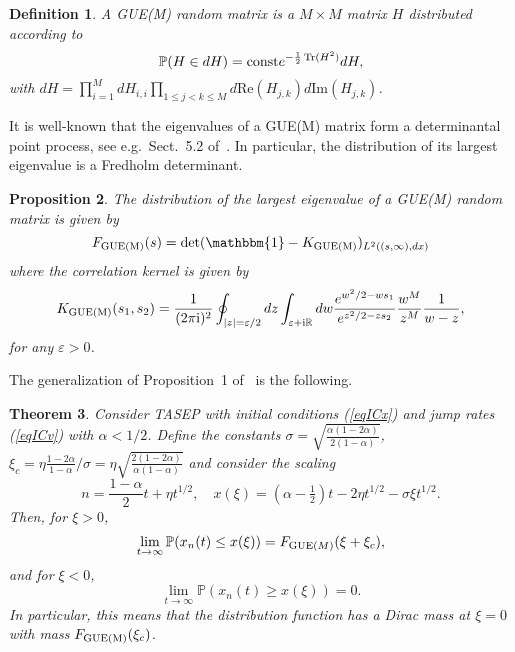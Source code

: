 \documentclass[12pt,a4paper]{article}
\numberwithin{equation}{section}
\newcommand{\Pb}{\mathbb{P}}
\newcommand{\Id}{\mathbbm{1}}
\newcommand{\e}{\varepsilon}
\newcommand{\I}{{\rm i}}
\newcommand{\R}{\mathbb{R}}
\renewcommand{\Re}{\mathrm{Re}}
\renewcommand{\Im}{\mathrm{Im}}
\DeclareMathOperator{\Tr}{Tr}
\newtheorem{prop}{Proposition}[section]
\newtheorem{thm}[prop]{Theorem}
\newtheorem{defin}[prop]{Definition}
\begin{document}
\begin{defin}
A GUE(M) random matrix is a $M\times M$ matrix $H$ distributed according to
\begin{equation}
\Pb(H\in dH)={\rm const} e^{-\frac12 \Tr(H^2)} dH,
\end{equation}
with $dH=\prod_{i=1}^M dH_{i,i}\prod_{1\leq j<k\leq M} d\Re(H_{j,k}) d\Im(H_{j,k})$.
\end{defin}
It is well-known that the eigenvalues of a GUE(M) matrix form a determinantal point process, see e.g.~Sect.~5.2 of~\cite{Meh91}. In particular, the distribution of its largest eigenvalue is a Fredholm determinant.
\begin{prop}
The distribution of the largest eigenvalue of a GUE(M) random matrix is given by
\begin{equation}
F_{\rm GUE(M)}(s)=\det(\Id-K_{\rm GUE(M)})_{L^2((s,\infty),dx)}
\end{equation}
where the correlation kernel is given by
\begin{equation}
K_{\rm GUE(M)}(s_1,s_2)=\frac{1}{(2\pi\I)^2}\oint_{|z|=\e/2} dz \int_{\e+\I\R} dw \frac{e^{w^2/2-w s_1}}{e^{z^2/2-z s_2}}\frac{w^M}{z^M}\frac{1}{w-z},
\end{equation}
for any $\e>0$.
\end{prop}

The generalization of Proposition~1 of~\cite{BFS09} is the following.
\begin{thm}\label{ThmMain}
Consider TASEP with initial conditions (\ref{eqICx}) and jump rates (\ref{eqICv}) with $\alpha<1/2$. Define the constants $\sigma=\sqrt{\frac{\alpha(1-2\alpha)}{2(1-\alpha)}}$, $\xi_c=\eta\frac{1-2\alpha}{1-\alpha}/\sigma=\eta \sqrt{\frac{2(1-2\alpha)}{\alpha(1-\alpha)}}$ and consider the scaling
\begin{equation}\label{eq2.6}
n=\frac{1-\alpha}{2}t+\eta t^{1/2},\quad x(\xi)=(\alpha-\tfrac12)t-2\eta t^{1/2}-\sigma \xi t^{1/2}.
\end{equation}
Then, for $\xi>0$,
\begin{equation}
\lim_{t\to\infty} \Pb(x_n(t)\leq x(\xi)) = F_{{\rm GUE}(M)}(\xi+\xi_c),
\end{equation}
and for $\xi<0$,
\begin{equation}
\lim_{t\to\infty} \Pb(x_n(t)\geq x(\xi)) = 0.
\end{equation}
In particular, this means that the distribution function has a Dirac mass at $\xi=0$ with mass
$F_{\rm GUE(M)}(\xi_c)$.
\end{thm}
\end{document}

